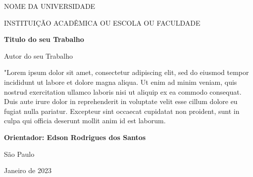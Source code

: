 \documentclass[a4paper,12pt]{article}
\begin{document}
\begin{titlepage}

\addtolength{\topmargin}{1.5cm}

\setlength{\baselineskip}{1.4\baselineskip}

\begin{center}
{\large{NOME DA UNIVERSIDADE}}

{\large{INSTITUIÇÃO ACADÊMICA OU ESCOLA OU FACULDADE}}

\end{center}
\vspace{2cm}
\begin{center}
{\Large\textbf{Titulo do seu Trabalho}}
\end{center}

\vspace{1.5cm}

\begin{center}
{\Large{Autor do seu Trabalho}}
\end{center}

\vspace{2cm}

\begin{flushright}

\begin{minipage}{10cm}

\hrulefill

"Lorem ipsum dolor sit amet, consectetur adipiscing elit, sed do eiusmod tempor incididunt ut labore et dolore magna aliqua. Ut enim ad minim veniam, quis nostrud exercitation ullamco laboris nisi ut aliquip ex ea commodo consequat. Duis aute irure dolor in reprehenderit in voluptate velit esse cillum dolore eu fugiat nulla pariatur. Excepteur sint occaecat cupidatat non proident, sunt in culpa qui officia deserunt mollit anim id est laborum.

\hrulefill

{\textbf{Orientador: Edson Rodrigues dos Santos}}

\end{minipage}
\end{flushright}

\setlength{\baselineskip}{0.7\baselineskip}


\vfill

\begin{center}
São Paulo

Janeiro de 2023
\end{center}



\end{titlepage}
\end{document}
